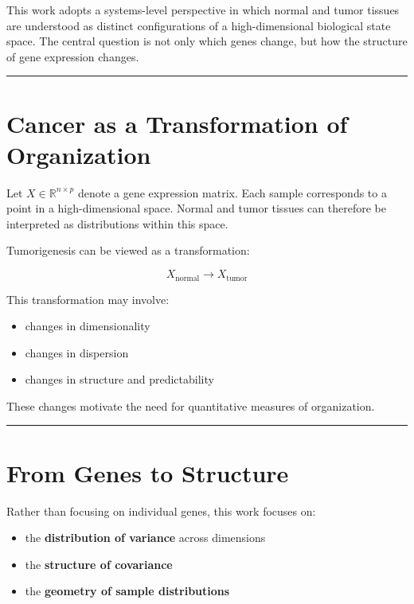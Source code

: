 \documentclass[
  letterpaper,
  DIV=11,
  numbers=noendperiod,
  openany,
  oneside]{scrreprt}
\providecommand{\tightlist}{%
  \setlength{\itemsep}{0pt}\setlength{\parskip}{0pt}}
\begin{document}
This work adopts a systems-level perspective in which normal and tumor
tissues are understood as distinct configurations of a high-dimensional
biological state space. The central question is not only which genes
change, but how the structure of gene expression changes.

\begin{center}\rule{0.5\linewidth}{0.5pt}\end{center}

\section{Cancer as a Transformation of
Organization}\label{cancer-as-a-transformation-of-organization}

Let \(X \in \mathbb{R}^{n \times p}\) denote a gene expression matrix.
Each sample corresponds to a point in a high-dimensional space. Normal
and tumor tissues can therefore be interpreted as distributions within
this space.

Tumorigenesis can be viewed as a transformation:

\[
X_{\text{normal}} \rightarrow X_{\text{tumor}}
\]

This transformation may involve:

\begin{itemize}
\tightlist
\item
  changes in dimensionality\\
\item
  changes in dispersion\\
\item
  changes in structure and predictability
\end{itemize}

These changes motivate the need for quantitative measures of
organization.

\begin{center}\rule{0.5\linewidth}{0.5pt}\end{center}

\section{From Genes to Structure}\label{from-genes-to-structure}

Rather than focusing on individual genes, this work focuses on:

\begin{itemize}
\tightlist
\item
  the \textbf{distribution of variance} across dimensions\\
\item
  the \textbf{structure of covariance}\\
\item
  the \textbf{geometry of sample distributions}
\end{itemize}
\end{document}
